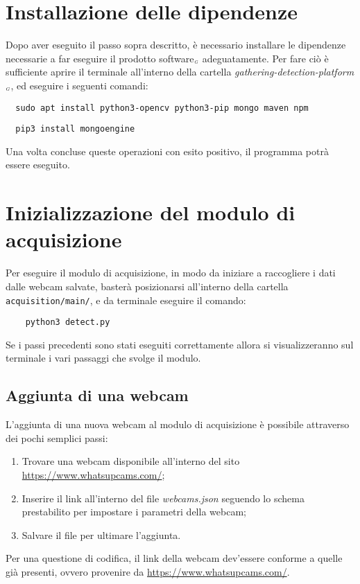 \section{Installazione delle dipendenze}\label{ProceduraDiInstallazioneInstallazioneDipendenze}
Dopo aver eseguito il passo sopra descritto, è necessario installare le dipendenze necessarie a far eseguire il prodotto software$_{\scaleto{G}{3pt}}$ adeguatamente.
Per fare ciò è sufficiente aprire il terminale all'interno della cartella \textit{gathering-detection-platform$_{\scaleto{G}{3pt}}$}, ed eseguire i seguenti comandi:
\begin{lstlisting}
  sudo apt install python3-opencv python3-pip mongo maven npm
\end{lstlisting}
\begin{lstlisting}
  pip3 install mongoengine
\end{lstlisting}

Una volta concluse queste operazioni con esito positivo, il programma potrà essere eseguito.

\section{Inizializzazione del modulo di acquisizione}\label{ProceduraDiInstallazioneInizializzazioneModuloAcquisition}
Per eseguire il modulo di acquisizione, in modo da iniziare a raccogliere i dati dalle webcam salvate, basterà posizionarsi all'interno della cartella \texttt{acquisition/main/}, e da terminale eseguire il comando:
\begin{lstlisting}
    python3 detect.py
\end{lstlisting}
Se i passi precedenti sono stati eseguiti correttamente allora si visualizzeranno sul terminale i vari passaggi che svolge il modulo.

\subsection{Aggiunta di una webcam}\label{ProceduraDiInstallazioneAggiuntaDiUnaWebcam}
L'aggiunta di una nuova webcam al modulo di acquisizione è possibile attraverso dei pochi semplici passi:
\begin{enumerate}
	\item Trovare una webcam disponibile all'interno del sito \url{https://www.whatsupcams.com/};
	\item Inserire il link all'interno del file \textit{webcams.json} seguendo lo schema prestabilito per impostare i parametri della webcam;
	\item Salvare il file per ultimare l'aggiunta.
\end{enumerate}
Per una questione di codifica, il link della webcam dev'essere conforme a quelle già presenti, ovvero provenire da \url{https://www.whatsupcams.com/}.


